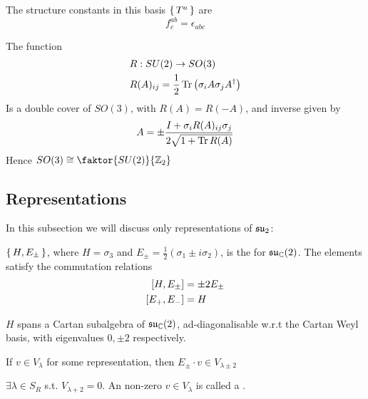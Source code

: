 \documentclass{article}
\begin{document}
\begin{fact}
	The structure constants in this basis $\set{  T^a  }$ are 
	\[
	f^{ab}_c=\epsilon_{abc}
	\]
\end{fact}

\begin{fact}
	The function 
	\begin{align*}
		& R : SU(2) \to SO(3) \\
		& R(A)_{ij} = \frac{1}{2}\tr\left( \sigma_i A \sigma_j A^\dagger \right)
	\end{align*}
	Is a double cover of $SO(3)$, with $R(A)=R(-A)$, and inverse given by 
	\[
	A=\pm \frac{I+\sigma_i R(A)_{ij} \sigma_j}{2\sqrt{1+\tr R(A)}}
	\]
	Hence $SO(3)\cong\faktor{SU(2)}{\mbb{Z}_2}$
\end{fact}

\subsection{Representations}

In this subsection we will discuss only representations of $\mf{su}_2$:

\begin{definition}
	$\set{  H, E_\pm  }$, where $H=\sigma_3$ and $E_\pm=\frac{1}{2}(\sigma_1\pm i\sigma_2 )$, is the  for $\mf{su}_\mbb{C}(2)$. The elements satisfy the commutation relations 
	\begin{align*}
		\comm[H]{E_\pm} &= \pm 2E_\pm \\
		\comm[E_+]{E_-} &= H
	\end{align*}
\end{definition} 

\begin{fact}
	$H$ spans a Cartan subalgebra of $\mf{su}_\mbb{C}(2)$, ad-diagonalisable w.r.t the Cartan Weyl basis, with eigenvalues $0, \pm 2$ respectively. 
\end{fact}

\begin{lemma}
	If $v \in V_\lambda$ for some representation, then $E_\pm \cdot v \in V_{\lambda\pm 2}$
\end{lemma}
\begin{corollary}
	$\exists \lambda \in S_R$ s.t. $V_{\lambda+2}=0$. An non-zero $v\in V_\lambda$ is called a . 
\end{corollary}
\end{document}
